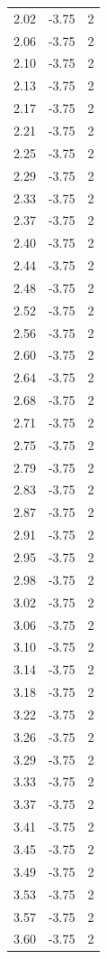 \begin{longtable}{lrr}
  2.02 & -3.75 & 2 \\
  2.06 & -3.75 & 2 \\
  2.10 & -3.75 & 2 \\
  2.13 & -3.75 & 2 \\
  2.17 & -3.75 & 2 \\
  2.21 & -3.75 & 2 \\
  2.25 & -3.75 & 2 \\
  2.29 & -3.75 & 2 \\
  2.33 & -3.75 & 2 \\
  2.37 & -3.75 & 2 \\
  2.40 & -3.75 & 2 \\
  2.44 & -3.75 & 2 \\
  2.48 & -3.75 & 2 \\
  2.52 & -3.75 & 2 \\
  2.56 & -3.75 & 2 \\
  2.60 & -3.75 & 2 \\
  2.64 & -3.75 & 2 \\
  2.68 & -3.75 & 2 \\
  2.71 & -3.75 & 2 \\
  2.75 & -3.75 & 2 \\
  2.79 & -3.75 & 2 \\
  2.83 & -3.75 & 2 \\
  2.87 & -3.75 & 2 \\
  2.91 & -3.75 & 2 \\
  2.95 & -3.75 & 2 \\
  2.98 & -3.75 & 2 \\
  3.02 & -3.75 & 2 \\
  3.06 & -3.75 & 2 \\
  3.10 & -3.75 & 2 \\
  3.14 & -3.75 & 2 \\
  3.18 & -3.75 & 2 \\
  3.22 & -3.75 & 2 \\
  3.26 & -3.75 & 2 \\
  3.29 & -3.75 & 2 \\
  3.33 & -3.75 & 2 \\
  3.37 & -3.75 & 2 \\
  3.41 & -3.75 & 2 \\
  3.45 & -3.75 & 2 \\
  3.49 & -3.75 & 2 \\
  3.53 & -3.75 & 2 \\
  3.57 & -3.75 & 2 \\
  3.60 & -3.75 & 2 \\

\end{longtable}
